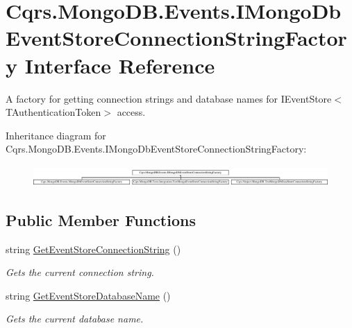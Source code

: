 \hypertarget{interfaceCqrs_1_1MongoDB_1_1Events_1_1IMongoDbEventStoreConnectionStringFactory}{}\section{Cqrs.\+Mongo\+D\+B.\+Events.\+I\+Mongo\+Db\+Event\+Store\+Connection\+String\+Factory Interface Reference}
\label{interfaceCqrs_1_1MongoDB_1_1Events_1_1IMongoDbEventStoreConnectionStringFactory}


A factory for getting connection strings and database names for I\+Event\+Store$<$\+T\+Authentication\+Token$>$ access.  


Inheritance diagram for Cqrs.\+Mongo\+D\+B.\+Events.\+I\+Mongo\+Db\+Event\+Store\+Connection\+String\+Factory\+:\begin{figure}[H]
\begin{center}
\leavevmode
\includegraphics[height=0.792640cm]{interfaceCqrs_1_1MongoDB_1_1Events_1_1IMongoDbEventStoreConnectionStringFactory}
\end{center}
\end{figure}
\subsection*{Public Member Functions}
\begin{DoxyCompactItemize}
\item 
string \hyperlink{interfaceCqrs_1_1MongoDB_1_1Events_1_1IMongoDbEventStoreConnectionStringFactory_a3860ea4bf6793b081f03fb7cc1dcbb27_a3860ea4bf6793b081f03fb7cc1dcbb27}{Get\+Event\+Store\+Connection\+String} ()
\begin{DoxyCompactList}\small\item\em Gets the current connection string. \end{DoxyCompactList}\item 
string \hyperlink{interfaceCqrs_1_1MongoDB_1_1Events_1_1IMongoDbEventStoreConnectionStringFactory_a81ee28bfbb0e567b95f2b280bc6fb298_a81ee28bfbb0e567b95f2b280bc6fb298}{Get\+Event\+Store\+Database\+Name} ()
\begin{DoxyCompactList}\small\item\em Gets the current database name. \end{DoxyCompactList}\end{DoxyCompactItemize}


